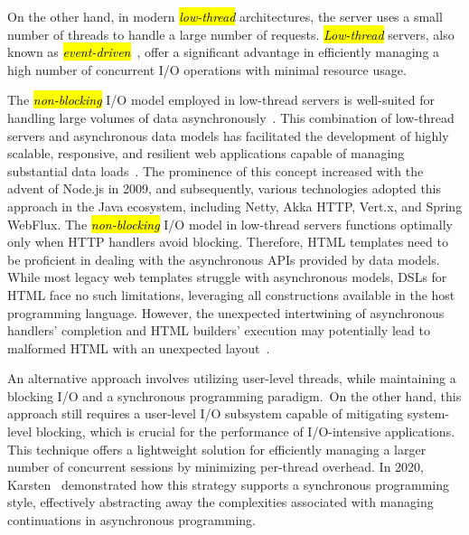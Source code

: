 \documentclass[software,article,accept,pdftex,moreauthors]{Definitions/mdpi}
\begin{document}
On the other hand, in modern \textit{\hl{low-thread}} architectures, the server uses
a small number of threads to handle a large number of requests.
\textit{\hl{Low-thread}} servers, also known as
\textit{\hl{event-driven}}~\cite{event-driven-servers}, offer a significant
advantage in efficiently managing a high number of concurrent I/O operations
with minimal resource usage.

The \textit{\hl{non-blocking}} I/O model employed in low-thread servers is
well-suited for handling large volumes of data asynchronously~\cite{Meijer12}.
This combination of low-thread servers and asynchronous data models has
facilitated the development of highly scalable, responsive, and resilient web
applications capable of managing substantial data loads~\cite{Jin15}. The
prominence of this concept increased with the advent of Node.js in 2009, and
subsequently, various technologies adopted this approach in the Java ecosystem,
including Netty, Akka HTTP, Vert.x, and Spring WebFlux.
The \textit{\hl{non-blocking}} I/O model in low-thread servers functions optimally
only when HTTP handlers avoid blocking. Therefore, HTML templates need to be
proficient in dealing with the asynchronous APIs provided by data models. While
most legacy web templates struggle with asynchronous models, DSLs for HTML face
no such limitations, leveraging all constructions available in the host
programming language. However, the unexpected intertwining of asynchronous
handlers' completion and HTML builders' execution may potentially lead to
malformed HTML with an unexpected layout~\cite{wise2024pssr}.

An alternative approach involves utilizing user-level threads, while
maintaining a blocking I/O and a synchronous programming paradigm.~On the other hand,
this approach still requires a user-level I/O subsystem capable of mitigating
system-level blocking, which is crucial for the performance of I/O-intensive
applications. This technique offers a lightweight solution for efficiently
managing a larger number of concurrent sessions by minimizing per-thread
overhead. In 2020, Karsten~\cite{karsten2020} demonstrated how this strategy
supports a synchronous programming style, effectively abstracting away the
complexities associated with managing continuations in asynchronous
programming.
\end{document}
